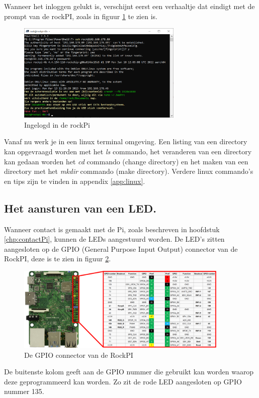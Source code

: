 Wanneer het inloggen gelukt is, verschijnt eerst een verhaaltje dat eindigt met de prompt van de rockPI, zoals in figuur \ref{fig:rockpiLogIn} te zien is.
\begin{figure}[h!]
	\centering
	\begin{center} 	
		\includegraphics[width=0.7\textwidth]{figuren/ingelogtRockPi}
		\caption{Ingelogd in de rockPi}
		\label{fig:rockpiLogIn}   
	\end{center}
\end{figure}
Vanaf nu werk je in een linux terminal omgeving. Een listing van een directory kan opgevraagd worden met het \textit{ls} commando, het veranderen van een directory kan gedaan worden het \textit{cd} commando (change directory) en het maken van een directory met het \textit{mkdir}  commando (make directory). Verdere linux commando's en tips zijn te vinden in appendix \ref{app:linux}.



\subsection{Het aansturen van een LED.}


Wanneer contact is gemaakt met de Pi, zoals beschreven in hoofdstuk \ref{chp:contactPi}, kunnen de LEDs aangestuurd worden. De LED's zitten aangesloten op de GPIO (General Purpose Input Output) connector van de RockPI, deze is te zien in figuur \ref{fig:rockpiCon}.
\begin{figure}[h!]
	\centering
	\begin{center} 	
		\includegraphics[width=0.9\textwidth]{figuren/rockpi-connector}
		\caption{De GPIO connector van de RockPI}
		\label{fig:rockpiCon}   
	\end{center}
\end{figure}
De buitenste kolom geeft aan de GPIO nummer die gebruikt kan worden waarop deze geprogrammeerd kan worden. Zo zit de rode LED aangesloten op GPIO nummer 135. \\



